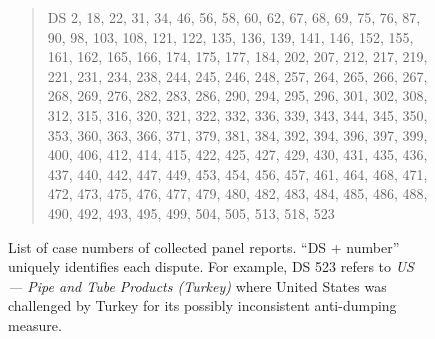 

\begin{figure}[h]
    \begin{quote}
        DS 2, 
        18, 
        22, 
        31, 
        34, 
        46, 
        56, 
        58, 
        60, 
        62, 
        67, 
        68, 
        69, 
        75, 
        76, 
        87, 
        90, 
        98, 
        103, 
        108, 
        121, 
        122, 
        135, 
        136, 
        139, 
        141, 
        146, 
        152, 
        155, 
        161, 
        162, 
        165, 
        166, 
        174, 
        175, 
        177, 
        184, 
        202, 
        207, 
        212, 
        217, 
        219, 
        221, 
        231, 
        234, 
        238, 
        244, 
        245, 
        246, 
        248, 
        257, 
        264, 
        265, 
        266, 
        267, 
        268, 
        269, 
        276, 
        282, 
        283, 
        286, 
        290, 
        294, 
        295, 
        296, 
        301, 
        302, 
        308, 
        312, 
        315, 
        316, 
        320, 
        321, 
        322, 
        332, 
        336, 
        339, 
        343, 
        344, 
        345, 
        350, 
        353, 
        360, 
        363, 
        366, 
        371, 
        379, 
        381, 
        384, 
        392, 
        394, 
        396, 
        397, 
        399, 
        400, 
        406, 
        412, 
        414, 
        415, 
        422, 
        425, 
        427, 
        429, 
        430, 
        431, 
        435, 
        436, 
        437, 
        440, 
        442, 
        447, 
        449, 
        453, 
        454, 
        456, 
        457, 
        461, 
        464, 
        468, 
        471, 
        472, 
        473, 
        475, 
        476, 
        477, 
        479, 
        480, 
        482, 
        483, 
        484, 
        485, 
        486, 
        488, 
        490, 
        492, 
        493, 
        495, 
        499, 
        504, 
        505, 
        513, 
        518, 
        523
    \end{quote}
    \caption{
        List of case numbers of collected panel reports. ``DS + number'' uniquely identifies each dispute. For example, DS 523 refers to \textit{US — Pipe and Tube Products (Turkey)} where United States was challenged by Turkey for its possibly inconsistent anti-dumping measure.
    }
    \label{fig:ds-cases-used}
\end{figure}

